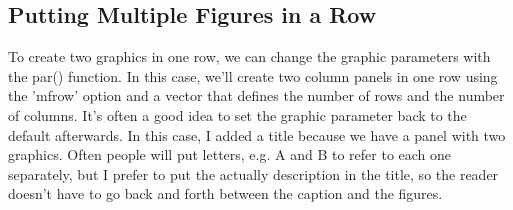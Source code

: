 \documentclass{article}\usepackage[]{graphicx}\usepackage[]{color}
\begin{document}
\subsection{Putting Multiple Figures in a Row}

To create two graphics in one row, we can change the graphic parameters with the par() function. In this case, we'll create two column panels in one row using the 'mfrow' option and a vector that defines the number of rows and the number of columns. It's often a good idea to set the graphic parameter back to the default afterwards. In this case, I added a title because we have a panel with two graphics. Often people will put letters, e.g. A and B to refer to each one separately, but I prefer to put the actually description in the title, so the reader doesn't have to go back and forth between the caption and the figures.
\end{document}
